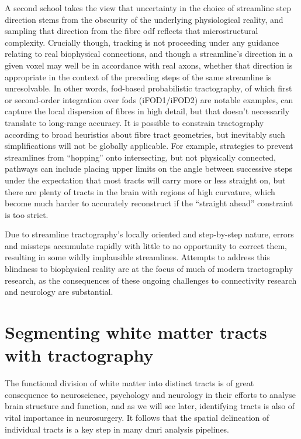 A second school takes the view that uncertainty in the choice of streamline step direction stems from the obscurity of the underlying physiological reality, and sampling that direction from the fibre \gls{odf} reflects that microstructural complexity.
Crucially though, tracking is not proceeding under any guidance relating to real biophysical connections, and though a streamline's direction in a given voxel may well be in accordance with real axons, whether that direction is appropriate in the context of the preceding steps of the same streamline is unresolvable.
In other words, \gls{fod}-based probabilistic tractography, of which first or second-order integration over \glspl{fod}  (iFOD1/iFOD2)\autocite{Tournier2012,Tournier2010} are notable examples, can capture the local dispersion of fibres in high detail, but that doesn't necessarily translate to long-range accuracy.
It is possible to constrain tractography according to broad heuristics about fibre tract geometries, but inevitably such simplifications will not be globally applicable.
For example, strategies to prevent streamlines from ``hopping'' onto intersecting, but not physically connected, pathways can include placing upper limits on the angle between successive steps under the expectation that most tracts will carry more or less straight on, but there are plenty of tracts in the brain with regions of high curvature, which become much harder to accurately reconstruct if the ``straight ahead'' constraint is too strict.

Due to streamline tractography's locally oriented and step-by-step nature, errors and missteps accumulate rapidly with little to no opportunity to correct them, resulting in some wildly implausible streamlines.
Attempts to address this blindness to biophysical reality are at the focus of much of modern tractography research\autocite{Bastiani2017,Rheault2019,Aydogan2021}, as the consequences of these ongoing challenges to connectivity research and neurology are substantial\autocite{Schilling2019, Yang2021, Grisot2021}.

\section{Segmenting white matter tracts with tractography}

The functional division of white matter into distinct tracts is of great consequence to neuroscience, psychology and neurology in their efforts to analyse brain structure and function, and as we will see later, identifying tracts is also of vital importance in neurosurgery.
It follows that the spatial delineation of individual tracts is a key step in many \gls{dmri} analysis pipelines.


